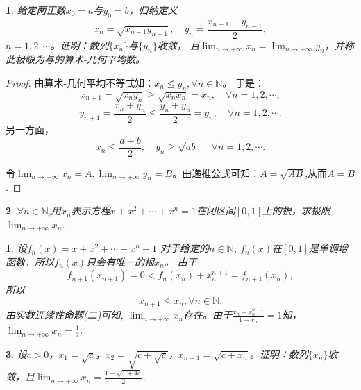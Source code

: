 \documentclass[utf8]{book}
\newtheorem{example}{}[section]             %
\newtheorem{solution}{}
\begin{document}
\begin{example}
给定两正数$x_0=a$与$y_0=b$，归纳定义$$x_n=\sqrt{x_{n-1}y_{n-1}}, \quad y_n=\frac{x_{n-1}+y_{n-1}}{2},$$ $n=1,2,\cdots$。证明：数列$\{x_n\}$与$\{y_n\}$收敛，
且$\displaystyle \lim_{n\to +\infty}x_n=\displaystyle \lim_{n\to +\infty}y_n$，并称此极限为与的算术-几何平均数。
\end{example}
\begin{proof}
由算术-几何平均不等式知：$x_n \leq y_n, \forall n\in\mathbb{N}$。
于是：
$$x_{n+1} = \sqrt{x_{n}y_{n}} \geq \sqrt{x_{n}x_{n}} = x_n,\quad\forall n = 1,2,\cdots,$$
$$y_{n+1} = \frac{x_{n}+y_{n}}{2} \leq \frac{y_{n}+y_{n}}{2} = y_n, \quad\forall n = 1,2,\cdots.$$
另一方面，$$x_n \leq \frac{a+b}{2}, \quad y_n \geq \sqrt{ab},\quad\forall n=1,2,\cdots.$$

令$\displaystyle \lim_{n\to +\infty}x_n=A, \displaystyle \lim_{n\to +\infty}y_n=B$。由递推公式可知：$A=\sqrt{AB}$,从而$A = B$.
\end{proof}
\begin{example}
$\forall n\in\mathbb{N}$,用$x_n$表示方程$x+x^2+\cdots+x^n=1$在闭区间$[0,1]$上的根，求极限$\displaystyle \lim_{n\to +\infty}x_n$.
\end{example}
\begin{solution}
设$f_n(x) = x+x^2+\cdots+x^n -1$
对于给定的$n\in \mathbb{N}$, $f_n(x)$在$[0,1]$是单调增函数，所以$f_n(x)$只会有唯一的根$x_n$。
由于$$f_{n+1}(x_{n+1}) = 0 < f_{n}(x_n) + x_n^{n+1} = f_{n+1}(x_n),$$
所以$$x_{n+1} \leq x_n,\forall n\in\mathbb{N}.$$
由实数连续性命题(二)可知, $\displaystyle \lim_{n\to +\infty}x_n$存在。由于$\displaystyle\frac{x_n-x_n^{n+1}}{1-x_n} = 1$知，
$\displaystyle \lim_{n\to +\infty}x_n=\frac{1}{2}$.
\end{solution}
\begin{example}
设$c> 0$，$x_1=\sqrt{c}$，$\displaystyle x_2=\sqrt{c+\sqrt{c}}$，$x_{n+1}=\sqrt{c+x_n}$。证明：数列$\{x_n\}$收敛，且$\displaystyle \lim_{n\to +\infty}x_n=\frac{1+\sqrt{1+4c}}{2}$.
\end{example}
\end{document}
